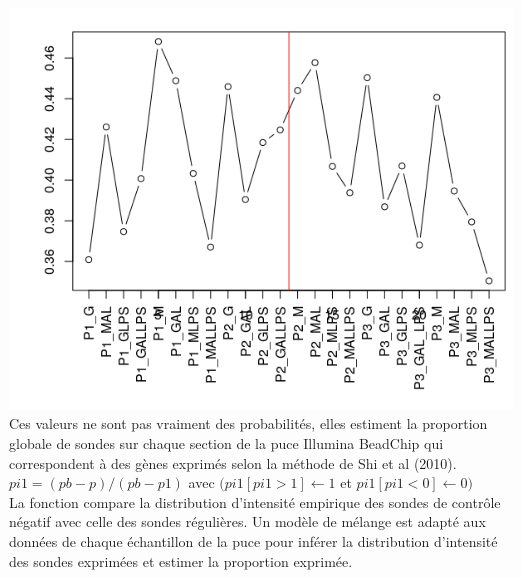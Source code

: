 \documentclass[a4paper,10pt]{article}
\begin{document}
\begin{center}
 \includegraphics[scale=0.5]{../../R/output/propexpr.png}
 Ces valeurs ne sont pas vraiment des probabilités, elles estiment la proportion globale de sondes sur chaque section de la puce Illumina BeadChip qui correspondent à des gènes exprimés selon la méthode de Shi et al (2010)\cite{shi2010estimating}.
 $pi1= (pb-p)/(pb-p1) $ avec $(pi1[pi1 > 1] \leftarrow 1 $ et $pi1[pi1 < 0] \leftarrow 0)$\\
 La fonction compare la distribution d’intensité empirique des sondes de contrôle négatif avec celle des sondes régulières. 
 Un modèle de mélange est adapté aux données de chaque échantillon de la puce pour inférer la distribution d’intensité des sondes exprimées et estimer la proportion exprimée.
\end{center}
\end{document}

